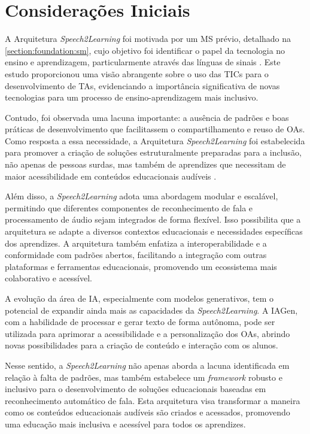 \section{Considerações Iniciais}

A Arquitetura \textit{Speech2Learning} foi motivada por um MS prévio, detalhado na \autoref{section:foundation:sm}, cujo objetivo foi identificar o papel da tecnologia no ensino e aprendizagem, particularmente através das línguas de sinais \cite{FalvoJr2020_SBIE, FalvoJr2020_FIE, FalvoJr2021_RENOTE}. Este estudo proporcionou uma visão abrangente sobre o uso das TICs para o desenvolvimento de TAs, evidenciando a importância significativa de novas tecnologias para um processo de ensino-aprendizagem mais inclusivo.

Contudo, foi observada uma lacuna importante: a ausência de padrões e boas práticas de desenvolvimento que facilitassem o compartilhamento e reuso de OAs. Como resposta a essa necessidade, a Arquitetura \textit{Speech2Learning} foi estabelecida para promover a criação de soluções estruturalmente preparadas para a inclusão, não apenas de pessoas surdas, mas também de aprendizes que necessitam de maior acessibilidade em conteúdos educacionais audíveis \cite{FalvoJr2023_HICSS}.

Além disso, a \textit{Speech2Learning} adota uma abordagem modular e escalável, permitindo que diferentes componentes de reconhecimento de fala e processamento de áudio sejam integrados de forma flexível. Isso possibilita que a arquitetura se adapte a diversos contextos educacionais e necessidades específicas dos aprendizes. A arquitetura também enfatiza a interoperabilidade e a conformidade com padrões abertos, facilitando a integração com outras plataformas e ferramentas educacionais, promovendo um ecossistema mais colaborativo e acessível.

A evolução da área de IA, especialmente com modelos generativos, tem o potencial de expandir ainda mais as capacidades da \textit{Speech2Learning}. A IAGen, com a habilidade de processar e gerar texto de forma autônoma, pode ser utilizada para aprimorar a acessibilidade e a personalização dos OAs, abrindo novas possibilidades para a criação de conteúdo e interação com os alunos.

Nesse sentido, a \textit{Speech2Learning} não apenas aborda a lacuna identificada em relação à falta de padrões, mas também estabelece um \textit{framework} robusto e inclusivo para o desenvolvimento de soluções educacionais baseadas em reconhecimento automático de fala. Esta arquitetura visa transformar a maneira como os conteúdos educacionais audíveis são criados e acessados, promovendo uma educação mais inclusiva e acessível para todos os aprendizes.

